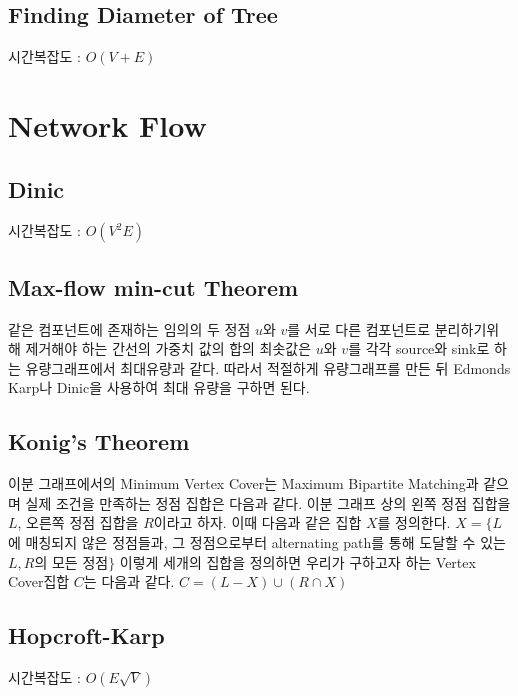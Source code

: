 \documentclass[10pt,landscape,a4paper,twocolumn]{article}
\begin{document}
\subsection{Finding Diameter of Tree}
시간복잡도 : $O(V+E)$



\section{Network Flow}
\subsection{Dinic}
시간복잡도 : $O(V^2E)$


\subsection{Max-flow min-cut Theorem}
\hspace{1em}같은 컴포넌트에 존재하는 임의의 두 정점 $u$와 $v$를 서로 다른 컴포넌트로 분리하기위해 제거해야 하는 간선의 가중치 값의 합의 최솟값은 $u$와 $v$를 각각 source와 sink로 하는 유량그래프에서 최대유량과 같다. 따라서 적절하게 유량그래프를 만든 뒤 Edmonds Karp나 Dinic을 사용하여 최대 유량을 구하면 된다.\\

\subsection{Konig's Theorem}
\hspace{1em}이분 그래프에서의 Minimum Vertex Cover는 Maximum Bipartite Matching과 같으며 실제 조건을 만족하는 정점 집합은 다음과 같다. 이분 그래프 상의 왼쪽 정점 집합을 $L$, 오른쪽 정점 집합을 $R$이라고 하자. 이때 다음과 같은 집합 $X$를 정의한다. $X=\{L$에 매칭되지 않은 정점들과, 그 정점으로부터 alternating path를 통해 도달할 수 있는 $L, R$의 모든 정점$\}$ 이렇게 세개의 집합을 정의하면 우리가 구하고자 하는 Vertex Cover집합 $C$는 다음과 같다. $C=(L-X)\cup{(R\cap{X})}$\\

%

\subsection{Hopcroft-Karp}
시간복잡도 : $O(E\sqrt{V})$

\end{document}
